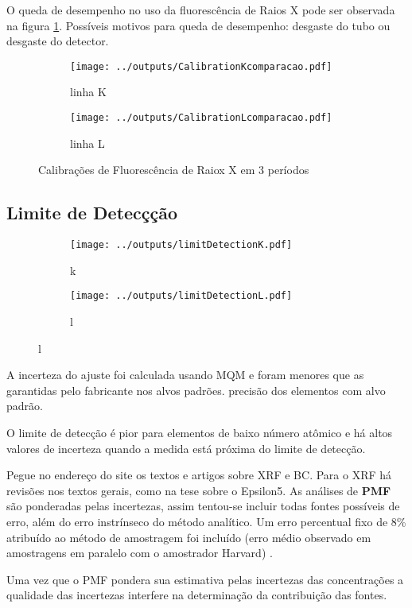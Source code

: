 %  

O queda de desempenho no uso da fluorescência de Raios X pode ser observada 
na figura \ref{fig:compara_calibracao}. 
Possíveis motivos para queda de desempenho: desgaste do tubo ou desgaste do detector. 

\begin{figure}[H]
  \begin{subfigure}[b]{0.5\textwidth}
    \texttt{[image: ../outputs/CalibrationKcomparacao.pdf]}
    \caption{linha K}
  \end{subfigure}%
  \begin{subfigure}[b]{0.5\textwidth}
    \texttt{[image: ../outputs/CalibrationLcomparacao.pdf]}
    \caption{linha L}
  \end{subfigure}
  \caption{Calibrações de Fluorescência de Raiox X em 3 períodos \label{fig:compara_calibracao}}
\end{figure}

\subsection{Limite de Detecçção}

\begin{figure}[H]
  \caption{}
  \begin{subfigure}[b]{0.5\textwidth}
    \texttt{[image: ../outputs/limitDetectionK.pdf]}
    \caption{k}
  \end{subfigure}%
  \begin{subfigure}[b]{0.5\textwidth}
    \texttt{[image: ../outputs/limitDetectionL.pdf]}
    \caption{l}
  \end{subfigure}
\end{figure}

A incerteza do ajuste foi calculada usando MQM e foram menores que as garantidas
pelo fabricante nos alvos padrões.  precisão dos elementos com alvo padrão. 

O limite de detecção é pior para elementos de baixo número atômico e há
altos valores de incerteza quando a medida está próxima do limite de detecção.

Pegue no endereço do site os textos e artigos sobre XRF e BC.
Para o XRF há revisões nos textos gerais, como na tese sobre o Epsilon5.
As análises de \textbf{PMF} são ponderadas pelas incertezas, assim 
tentou-se incluir todas fontes possíveis de erro, além do erro instrínseco 
do método analítico. Um erro percentual fixo de 8\% atribuído ao método 
de amostragem foi incluído 
(erro médio observado em amostragens em paralelo com o amostrador Harvard)
\citep{santos2014}.



Uma vez que o PMF pondera sua estimativa pelas incertezas das concentrações a qualidade das incertezas interfere na determinação da contribuição das fontes.

